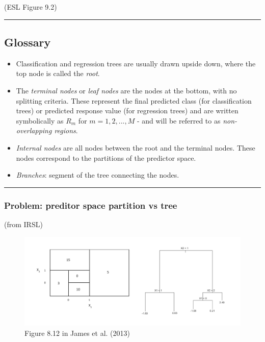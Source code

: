 \documentclass[
  letterpaper,
  DIV=11,
  numbers=noendperiod]{scrartcl}
\providecommand{\tightlist}{%
  \setlength{\itemsep}{0pt}\setlength{\parskip}{0pt}}\usepackage{longtable,booktabs,array}
\begin{document}
(ESL Figure 9.2)

\begin{center}\rule{0.5\linewidth}{0.5pt}\end{center}

\hypertarget{glossary}{%
\subsection{Glossary}\label{glossary}}

\begin{itemize}
\tightlist
\item
  Classification and regression trees are usually drawn upside down,
  where the top node is called the \emph{root}.
\item
  The \emph{terminal nodes} or \emph{leaf nodes} are the nodes at the
  bottom, with no splitting criteria. These represent the final
  predicted class (for classification trees) or predicted response value
  (for regression trees) and are written symbolically as \(R_m\) for
  \(m = 1, 2, ..., M\) - and will be referred to as
  \emph{non-overlapping regions}.
\item
  \emph{Internal nodes} are all nodes between the root and the terminal
  nodes. These nodes correspond to the partitions of the predictor
  space.
\item
  \emph{Branches}: segment of the tree connecting the nodes.
\end{itemize}

\begin{center}\rule{0.5\linewidth}{0.5pt}\end{center}

\hypertarget{problem-preditor-space-partition-vs-tree}{%
\subsubsection{Problem: preditor space partition vs
tree}\label{problem-preditor-space-partition-vs-tree}}

(from IRSL)

\begin{figure}

{\centering \includegraphics[width=1\textwidth,height=\textheight]{./ILSR812.png}

}

\caption{Figure 8.12 in James et al. (2013)}

\end{figure}
\end{document}
